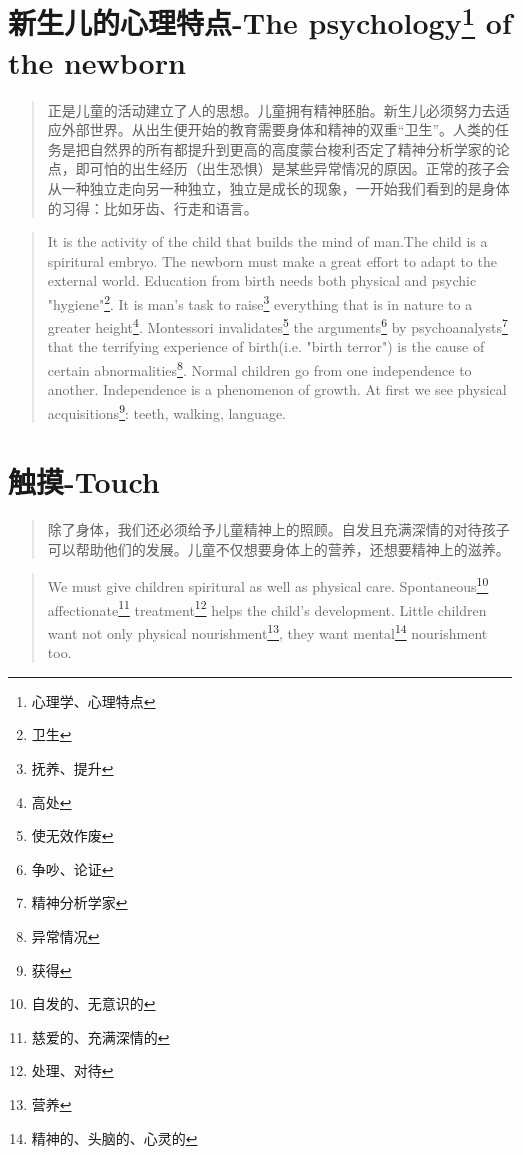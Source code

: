 \documentclass[lang=cn,10pt]{elegantbook}
\begin{document}
\chapter{新生儿的心理特点-The psychology\footnote{心理学、心理特点} of the newborn}

\begin{quote}
{\small 正是儿童的活动建立了人的思想。儿童拥有精神胚胎。新生儿必须努力去适应外部世界。从出生便开始的教育需要身体和精神的双重“卫生”。人类的任务是把自然界的所有都提升到更高的高度蒙台梭利否定了精神分析学家的论点，即可怕的出生经历（出生恐惧）是某些异常情况的原因。正常的孩子会从一种独立走向另一种独立，独立是成长的现象，一开始我们看到的是身体的习得：比如牙齿、行走和语言。}
\end{quote}

\begin{tcolorbox}
\begin{quote}
{\small It is the activity of the child that builds the mind of man.The child is a spiritural embryo. The newborn must make a great effort to adapt to the external world. Education from birth needs both physical and psychic "hygiene"\footnote{卫生}. It is man's task to raise\footnote{抚养、提升} everything that is in nature to a greater height\footnote{高处}. Montessori invalidates\footnote{使无效作废} the arguments\footnote{争吵、论证} by psychoanalysts\footnote{精神分析学家} that the terrifying experience of birth(i.e. "birth terror") is the cause of certain abnormalities\footnote{异常情况}. Normal children go from one independence to another. Independence is a phenomenon of growth. At first we see physical acquisitions\footnote{获得}: teeth, walking, language.}
\end{quote}
\end{tcolorbox}

\chapter{触摸-Touch}

\begin{quote}
{\small 除了身体，我们还必须给予儿童精神上的照顾。自发且充满深情的对待孩子可以帮助他们的发展。儿童不仅想要身体上的营养，还想要精神上的滋养。}
\end{quote}

\begin{tcolorbox}
\begin{quote}
{\small We must give children spiritural as well as physical care. Spontaneous\footnote{自发的、无意识的} affectionate\footnote{慈爱的、充满深情的} treatment\footnote{处理、对待} helps the child's development. Little children want not only physical nourishment\footnote{营养}, they want mental\footnote{精神的、头脑的、心灵的} nourishment too.}
\end{quote}
\end{tcolorbox}
\end{document}

